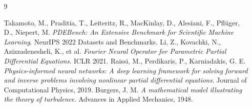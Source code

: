 \documentclass[a4paper,11pt,fontset=windows]{ctexart}
\begin{document}
\begin{thebibliography}{9}
 Takamoto, M., Praditia, T., Leiteritz, R., MacKinlay, D., Alesiani, F.,
  Pfl\"uger, D., Niepert, M. \emph{PDEBench: An Extensive Benchmark for Scientific Machine
  Learning}. NeurIPS 2022 Datasets and Benchmarks.
 Li, Z., Kovachki, N., Azizzadenesheli, K., et al. \emph{Fourier Neural Operator
  for Parametric Partial Differential Equations}. ICLR 2021.
 Raissi, M., Perdikaris, P., Karniadakis, G. E. \emph{Physics-informed neural
  networks: A deep learning framework for solving forward and inverse problems involving
  nonlinear partial differential equations}. Journal of Computational Physics, 2019.
 Burgers, J. M. \emph{A mathematical model illustrating the theory of
  turbulence}. Advances in Applied Mechanics, 1948.
\end{thebibliography}
\end{document}
